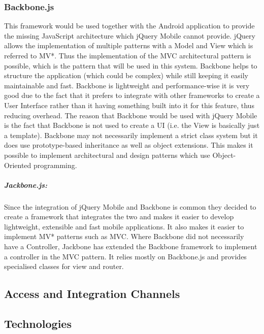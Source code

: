 \documentclass[a4paper,12pt]{article}
\begin{document}
\subsubsection{Backbone.js}
This framework would be used together with the Android application to provide the missing JavaScript architecture which jQuery Mobile cannot provide. jQuery allows the implementation of multiple patterns with a Model and View which is referred to MV*. Thus the implementation of the MVC architectural pattern is possible, which is the pattern that will be used in this system. Backbone helps to structure the application (which could be complex) while still keeping it easily maintainable and fast. Backbone is lightweight and performance-wise it is very good due to the fact that it prefers to integrate with other frameworks to create a User Interface rather than it having something built into it for this feature, thus reducing overhead. The reason that Backbone would be used with jQuery Mobile is the fact that Backbone is not used to create a UI (i.e. the View is basically just a template). Backbone may not necessarily implement a strict class system but it does use prototype-based inheritance as well as object extensions. This makes it possible to implement architectural and design patterns which use Object-Oriented programming.

\subparagraph{Jackbone.js:}
Since the integration of jQuery Mobile and Backbone is common they decided to create a framework that integrates the two and makes it easier to develop lightweight, extensible and fast mobile applications. It also makes it easier to implement MV* patterns such as MVC. Where Backbone did not necessarily have a Controller, Jackbone has extended the Backbone framework to implement a controller in the MVC pattern. It relies mostly on Backbone.js and provides specialised classes for view and router.

\subsection{Access and Integration Channels}

\subsection{Technologies}
\end{document}
